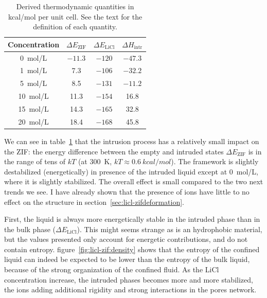 \documentclass[thesis]{subfiles}
\begin{document}
\begin{table}[ht]
    \caption{Derived thermodynamic quantities in kcal/mol per unit cell. See
    the text for the definition of each quantity.}
    \label{table:thermo}
    \centering
    \renewcommand{\arraystretch}{1.3}
    \begin{tabular}{c | c c c }
        \toprule
        Concentration  & $\Delta E_\text{ZIF}$ & $\Delta E_\text{LiCl}$ & $\Delta H_\text{intr}$ \\
        \midrule
        \SI{0}{mol/L}  &    $-11.3$            &    $-120$                &    $-47.3$               \\
        \SI{1}{mol/L}  &       7.3             &    $-106$                &    $-32.2$               \\
        \SI{5}{mol/L}  &       8.5             &    $-131$                &    $-11.2$               \\
        \SI{10}{mol/L} &      11.3             &    $-154$                &     16.8               \\
        \SI{15}{mol/L} &      14.3             &    $-165$                &     32.8               \\
        \SI{20}{mol/L} &      18.4             &    $-168$                &     45.8               \\
        \bottomrule
    \end{tabular}
\end{table}

We can see in table~\ref{table:thermo} that the intrusion process has a
relatively small impact on the ZIF: the energy difference between the empty and
intruded states $\Delta E_\text{ZIF}$ is in the range of tens of $kT$ (at \SI{300}{K},
$kT \approx \SI{0.6}{kcal/mol}$). The  framework is slightly destabilized
(energetically) in presence of the intruded liquid except at \SI{0}{mol/L},
where it is slightly stabilized. The overall effect is small compared to the two
next trends we see. I have already shown that the presence of ions have little
to no effect on the  structure in section~\ref{sec:licl-zifdeformation}.

First, the liquid is always more energetically stable in the intruded phase than
in the bulk phase ($\Delta E_\text{LiCl}$). This might seems strange as  is
an hydrophobic material, but the values presented only account for energetic
contributions, and do not contain entropy. figure~\ref{fig:licl-zif:density}
shows that the entropy of the confined liquid can indeed be expected to be lower
than the entropy of the bulk liquid, because of the strong organization of the
confined fluid. As the LiCl concentration increase, the intruded phases becomes
more and more stabilized, the ions adding additional rigidity and strong
interactions in the pores network.
\end{document}
